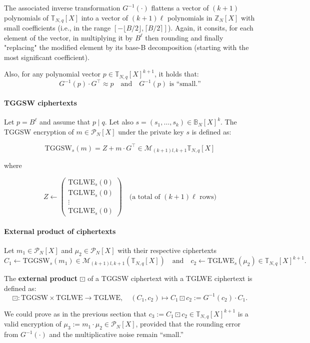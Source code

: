 \documentclass{article}
\newcommand{\Z}{\mathbb{Z}}
\newcommand{\T}{\mathbb{T}}
\newcommand{\Pcal}{\mathcal{P}}
\theoremstyle{definition}
\theoremstyle{Theorem}
\begin{document}
The associated inverse transformation $G^{-1}(\cdot)$ flattens a vector of $(k+1)$ polynomials of $\T_{N,q}[X]$ into a vector of $(k+1)\ell$ polynomials in $\Z_N[X]$ with small coefficients (i.e., in the range $\left[ -\lfloor B/2 \rfloor, \lceil B/2 \rceil \right]$). Again, it consits, for each element of the vector, in multiplying it by $B^\ell$ then rounding and finally "replacing" the modified element by its base-B decomposition (starting with the most significant coefficient). 

Also, for any polynomial vector $p \in \mathbb{T}_{N,q}[X]^{k+1}$, it holds that:
\[
G^{-1}(p) \cdot G^\top \approx p \quad \text{and} \quad G^{-1}(p) \text{ is ``small.''}
\]

\paragraph{TGGSW ciphertexts}
Let $p = B^\ell$ and assume that $p \mid q$. Let also $s = (s_1, \ldots, s_k) \in \mathbb{B}_N[X]^k$. The TGGSW encryption of $m \in \Pcal_N[X]$ under the private key $s$ is defined as:

\[
\text{TGGSW}_s(m) = Z + m \cdot G^\top \in \mathcal{M}_{(k+1)l,k+1}\T_{N,q}[X]
\]

where

\[
Z \leftarrow 
\begin{pmatrix}
\text{TGLWE}_s(0) \\
\text{TGLWE}_s(0) \\
\vdots \\
\text{TGLWE}_s(0)
\end{pmatrix}
\quad \text{(a total of } (k+1)\ell \text{ rows)}
\]

\paragraph{External product of ciphertexts}

Let $m_1 \in \Pcal_N[X]$ and $\mu_2 \in \Pcal_N[X]$ with their respective ciphertexts 
\[
C_1 \gets \text{TGGSW}_s(m_1) \in \mathcal{M}_{(k+1)l,k+1}(\T_{N,q}[X]) \quad \text{and} \quad c_2 \gets \text{TGLWE}_s(\mu_2) \in \mathbb{T}_{N,q}[X]^{k+1}.
\]

The \textbf{external product} $\boxdot$ of a TGGSW ciphertext with a TGLWE ciphertext is defined as:
\[
\boxdot: \text{TGGSW} \times \text{TGLWE} \rightarrow \text{TGLWE}, \quad
(C_1, c_2) \mapsto C_1 \boxdot c_2 := G^{-1}(c_2) \cdot C_1.
\]

We could prove as in the previous section that  $c_3 := C_1 \boxdot c_2 \in \T_{N,q}[X]^{k+1}$ is a valid encryption of 
$\mu_3 := m_1 \cdot \mu_2 \in \Pcal_N[X]$,
provided that the rounding error from $G^{-1}(\cdot)$ and the multiplicative noise remain ``small.''
\end{document}
